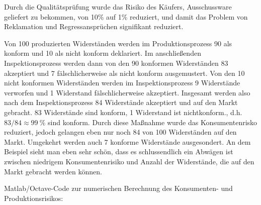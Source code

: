 Durch die Qualitätsprüfung wurde das Risiko des Käufers,
Ausschussware geliefert zu bekommen, von 10\% auf 1\% reduziert, und damit das
Problem von Reklamation und Regressansprüchen signifikant reduziert.

Von 100 produzierten Widerständen werden im Produktionsprozess 90 als konform und 10 als nicht konform deklariert. Im anschließenden Inspektionsprozess werden dann von den 90 konformen Widerständen 83 akzeptiert und 7 fälschlicherweise als nicht konform ausgemustert. Von den 10 nicht konformen Widerständen werden im Inspektionsprozess 9 Widerstände verworfen und 1 Widerstand fälschlicherweise akzeptiert.
Insgesamt werden also nach dem Inspektionsprozess 84 Widerstände akzeptiert und
auf den Markt gebracht. 83 Widerstände sind konform, 1 Widerstand ist nichtkonform., d.h. $83/84 \approx 99~\%$ sind konform.
Durch diese Maßnahme wurde das Konsumentenrisko reduziert, jedoch gelangen eben nur noch 84 von 100 Widerständen auf den Markt. Umgekehrt werden auch 7 konforme Widerstände ausgesondert. An dem Beispiel sieht man eben sehr schön,
dass es schlussendlich ein Abwägen ist zwischen niedrigem Konsumentenrisiko und
Anzahl der Widerstände, die auf den Markt gebracht werden können.

Matlab/Octave-Code zur numerischen Berechnung des Konsumenten- und Produktionsrisikos:

